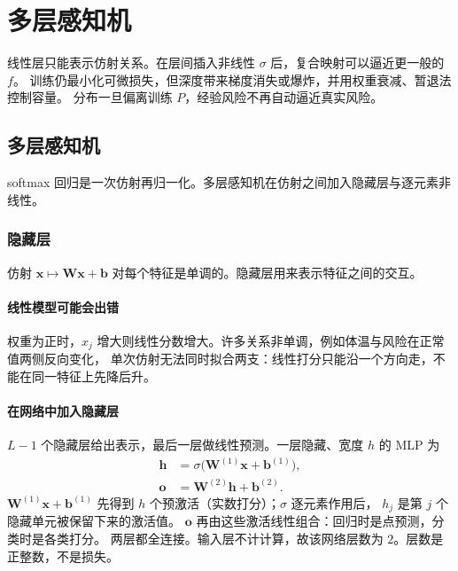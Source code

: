 \chapter{多层感知机}

线性层只能表示仿射关系。在层间插入非线性 $\sigma$ 后，复合映射可以逼近更一般的 $f$。
训练仍最小化可微损失，但深度带来梯度消失或爆炸，并用权重衰减、暂退法控制容量。
分布一旦偏离训练 $P$，经验风险不再自动逼近真实风险。

\section{多层感知机}



softmax 回归是一次仿射再归一化。多层感知机在仿射之间加入隐藏层与逐元素非线性。

\subsection{隐藏层}

仿射 $\bm{x}\mapsto\bm{W}\bm{x}+\bm{b}$ 对每个特征是单调的。隐藏层用来表示特征之间的交互。

\subsubsection{线性模型可能会出错}

权重为正时，$x_{j}$ 增大则线性分数增大。许多关系非单调，例如体温与风险在正常值两侧反向变化，
单次仿射无法同时拟合两支：线性打分只能沿一个方向走，不能在同一特征上先降后升。

\subsubsection{在网络中加入隐藏层}

$L-1$ 个隐藏层给出表示，最后一层做线性预测。一层隐藏、宽度 $h$ 的 MLP 为
\begin{align*}
\bm{h}&=\sigma\bigl(\bm{W}^{(1)}\bm{x}+\bm{b}^{(1)}\bigr),\\
\bm{o}&=\bm{W}^{(2)}\bm{h}+\bm{b}^{(2)}.
\end{align*}
$\bm{W}^{(1)}\bm{x}+\bm{b}^{(1)}$ 先得到 $h$ 个预激活（实数打分）；$\sigma$ 逐元素作用后，
$h_j$ 是第 $j$ 个隐藏单元被保留下来的激活值。
$\bm{o}$ 再由这些激活线性组合：回归时是点预测，分类时是各类打分。
两层都全连接。输入层不计计算，故该网络层数为 $2$。层数是正整数，不是损失。

